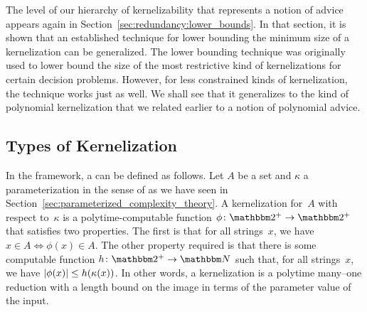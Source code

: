 The level of our hierarchy of kernelizability that represents a notion of advice appears again in Section~\ref{sec:redundancy:lower_bounds}.
In that section, it is shown that an established technique for lower bounding the minimum size of a kernelization can be generalized.
The lower bounding technique was originally used to lower bound the size of the most restrictive kind of kernelizations for certain decision problems.
However, for less constrained kinds of kernelization, the technique works just as well.
We shall see that it generalizes to the kind of polynomial kernelization that we related earlier to a notion of polynomial advice.

\subsection{Types of Kernelization}
\label{sec:redundancy:types}%
In the \citeauthor{flum2006parameterized} framework, a  can be defined as follows.
Let $A$ be a set and $\kappa$ a parameterization in the sense of \citeauthor{flum2006parameterized} as we have seen in Section~\ref{sec:parameterized_complexity_theory}.
A kernelization for~$A$ with respect to~$\kappa$ is a polytime-computable function $\phi\colon \binary^+ \to \binary^+$ that satisfies two properties.
The first is that for all strings~$x$, we have $x \in A \iff \phi(x) \in A$.
The other property required is that there is some computable function $h\colon \binary^+ \to \bbN$ such that, for all strings~$x$, we have ${\lvert\phi(x)\rvert} \le h(\kappa(x))$.
In other words, a kernelization is a polytime many--one reduction with a length bound on the image in terms of the parameter value of the input.

